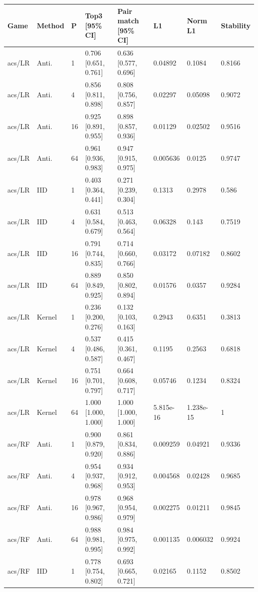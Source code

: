 \endgroup


\begingroup\footnotesize\setlength{\tabcolsep}{3pt}
\begin{tabular}{llllllll}
\toprule
Game & Method & P & Top3 [95\% CI] & Pair match [95\% CI] & L1 & Norm L1 & Stability \\
\midrule
acs/LR & Anti. & 1 & 0.706 [0.651, 0.761] & 0.636 [0.577, 0.696] & 0.04892 & 0.1084 & 0.8166 \\
acs/LR & Anti. & 4 & 0.856 [0.811, 0.898] & 0.808 [0.756, 0.857] & 0.02297 & 0.05098 & 0.9072 \\
acs/LR & Anti. & 16 & 0.925 [0.891, 0.955] & 0.898 [0.857, 0.936] & 0.01129 & 0.02502 & 0.9516 \\
acs/LR & Anti. & 64 & 0.961 [0.936, 0.983] & 0.947 [0.915, 0.975] & 0.005636 & 0.0125 & 0.9747 \\
acs/LR & IID & 1 & 0.403 [0.364, 0.441] & 0.271 [0.239, 0.304] & 0.1313 & 0.2978 & 0.586 \\
acs/LR & IID & 4 & 0.631 [0.584, 0.679] & 0.513 [0.463, 0.564] & 0.06328 & 0.143 & 0.7519 \\
acs/LR & IID & 16 & 0.791 [0.744, 0.835] & 0.714 [0.660, 0.766] & 0.03172 & 0.07182 & 0.8602 \\
acs/LR & IID & 64 & 0.889 [0.849, 0.925] & 0.850 [0.802, 0.894] & 0.01576 & 0.0357 & 0.9284 \\
acs/LR & Kernel & 1 & 0.236 [0.200, 0.276] & 0.132 [0.103, 0.163] & 0.2943 & 0.6351 & 0.3813 \\
acs/LR & Kernel & 4 & 0.537 [0.486, 0.587] & 0.415 [0.361, 0.467] & 0.1195 & 0.2563 & 0.6818 \\
acs/LR & Kernel & 16 & 0.751 [0.701, 0.797] & 0.664 [0.608, 0.717] & 0.05746 & 0.1234 & 0.8324 \\
acs/LR & Kernel & 64 & 1.000 [1.000, 1.000] & 1.000 [1.000, 1.000] & 5.815e-16 & 1.238e-15 & 1 \\
acs/RF & Anti. & 1 & 0.900 [0.879, 0.920] & 0.861 [0.834, 0.886] & 0.009259 & 0.04921 & 0.9336 \\
acs/RF & Anti. & 4 & 0.954 [0.937, 0.968] & 0.934 [0.912, 0.953] & 0.004568 & 0.02428 & 0.9685 \\
acs/RF & Anti. & 16 & 0.978 [0.967, 0.986] & 0.968 [0.954, 0.979] & 0.002275 & 0.01211 & 0.9845 \\
acs/RF & Anti. & 64 & 0.988 [0.981, 0.995] & 0.984 [0.975, 0.992] & 0.001135 & 0.006032 & 0.9924 \\
acs/RF & IID & 1 & 0.778 [0.754, 0.802] & 0.693 [0.665, 0.721] & 0.02165 & 0.1152 & 0.8502 \\

\end{tabular}
